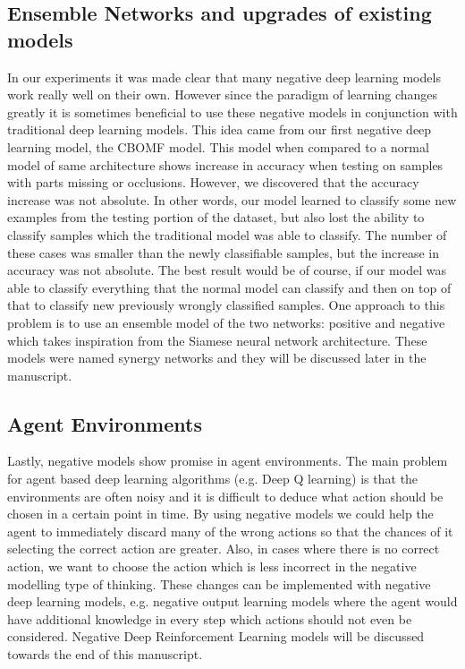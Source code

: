 \documentclass[b5paper]{book}
\begin{document}
\subsection{Ensemble Networks and upgrades of existing models}

In our experiments it was made clear that many negative deep learning models work really well on their own. However since the paradigm of learning changes greatly it is sometimes beneficial to use these negative models in conjunction with traditional deep learning models. This idea came from our first negative deep learning model, the CBOMF model. This model when compared to a normal model of same architecture shows increase in accuracy when testing on samples with parts missing or occlusions. However, we discovered that the accuracy increase was not absolute. In other words, our model learned to classify some new examples from the testing portion of the dataset, but also lost the ability to classify samples which the traditional model was able to classify. The number of these cases was smaller than the newly classifiable samples, but the increase in accuracy was not absolute. The best result would be of course, if our model was able to classify everything that the normal model can classify and then on top of that to classify new previously wrongly classified samples. One approach to this problem is to use an ensemble model of the two networks: positive and negative which takes inspiration from the Siamese neural network architecture. These models were named synergy networks and they will be discussed later in the manuscript.

\subsection{Agent Environments}

Lastly, negative models show promise in agent environments. The main problem for agent based deep learning algorithms (e.g. Deep Q learning) is that the environments are often noisy and it is difficult to deduce what action should be chosen in a certain point in time. By using negative models we could help the agent to immediately discard many of the wrong actions so that the chances of it selecting the correct action are greater. Also, in cases where there is no correct action, we want to choose the action which is less incorrect in the negative modelling type of thinking. These changes can be implemented with negative deep learning models, e.g. negative output learning models where the agent would have additional knowledge in every step which actions should not even be considered. Negative Deep Reinforcement Learning models will be discussed towards the end of this manuscript.
\end{document}
